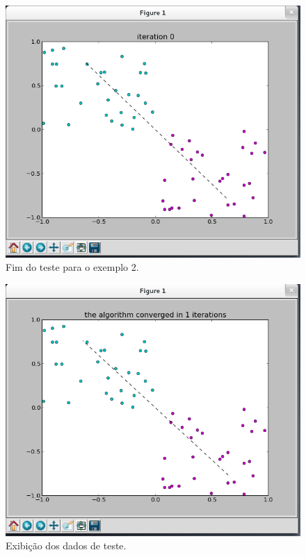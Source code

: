 \documentclass[brazil, a4paper]{article}
\begin{document}
\begin{itemize}
\begin{figure}[!htb]
\centering
\includegraphics[scale=0.25]{ex3-2.png}
\caption{Fim do teste para o exemplo 2.}
\end{figure}

\newpage

\begin{figure}[!htb]
\centering
\includegraphics[scale=0.25]{ex3-3.png}
\caption{Exibição dos dados de teste.}
\end{figure}


\end{itemize}
\end{document}
